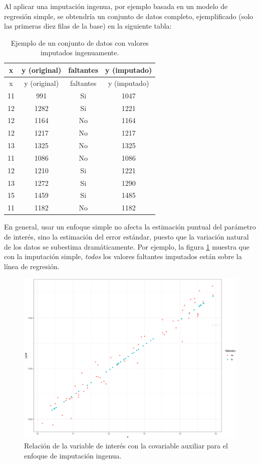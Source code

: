 \documentclass[
  12pt,
]{book}
\begin{document}
Al aplicar una imputación ingenua, por ejemplo basada en un modelo de regresión simple, se obtendría un conjunto de datos completo, ejemplificado (solo las primeras diez filas de la base) en la siguiente tabla:

\begin{longtable}[]{@{}cccc@{}}
\caption{Ejemplo de un conjunto de datos con valores imputados ingenuamente.}\tabularnewline
\toprule()
x & y (original) & faltantes & y (imputado) \\
\midrule()
\endfirsthead
\toprule()
x & y (original) & faltantes & y (imputado) \\
\midrule()
\endhead
11 & 991 & Si & 1047 \\
12 & 1282 & Si & 1221 \\
12 & 1164 & No & 1164 \\
12 & 1217 & No & 1217 \\
13 & 1325 & No & 1325 \\
11 & 1086 & No & 1086 \\
12 & 1210 & Si & 1221 \\
13 & 1272 & Si & 1290 \\
15 & 1459 & Si & 1485 \\
11 & 1182 & No & 1182 \\
\bottomrule()
\end{longtable}

En general, usar un enfoque simple no afecta la estimación puntual del parámetro de interés, sino la estimación del error estándar, puesto que la variación natural de los datos se subestima dramáticamente. Por ejemplo, la figura \ref{fig:figim2} muestra que con la imputación simple, \emph{todos} los valores faltantes imputados están sobre la línea de regresión.

\begin{figure}
\includegraphics[width=0.5\linewidth]{Pics/im2} \caption{Relación de la variable de interés con la covariable auxiliar para el enfoque de imputación ingenua.}\label{fig:figim2}
\end{figure}
\end{document}
